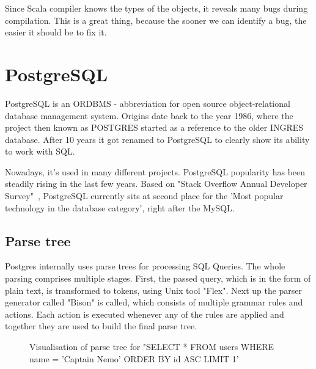 \documentclass[thesis=B,english]{FITthesis}[2019/12/23]
\begin{document}
Since Scala compiler knows the types of the objects, it reveals many bugs during compilation. This is a great thing, because the sooner we can identify a bug, the easier it should be to fix it. 

\newpage
\section{PostgreSQL}
PostgreSQL is an ORDBMS - abbreviation for open source object-relational database management system.\cite{PostgreSQL} Origins date back to the year 1986, where the project then known as POSTGRES started as a reference to the older INGRES database. After 10 years it got renamed to PostgreSQL to clearly show its ability to work with SQL. 

Nowadays, it's used in many different projects. PostgreSQL popularity has been steadily rising in the last few years. Based on "Stack Overflow Annual Developer Survey"~\cite{Stackoverflow survey}, PostgreSQL currently sits at second place for the 'Most popular technology in the database category', right after the MySQL.

\subsection{Parse tree}
Postgres internally uses parse trees for processing SQL Queries. The whole parsing comprises multiple stages. First, the passed query, which is in the form of plain text, is transformed to tokens, using Unix tool "Flex". Next up the parser generator called "Bison" is called, which consists of multiple grammar rules and actions. Each action is executed whenever any of the rules are applied and together they are used to build the final parse tree.
\newline

\begin{figure}[h]
  \caption {Visualisation of parse tree for "SELECT * FROM users WHERE name = 'Captain Nemo' ORDER BY id ASC LIMIT 1'}
\end{figure}
\end{document}
